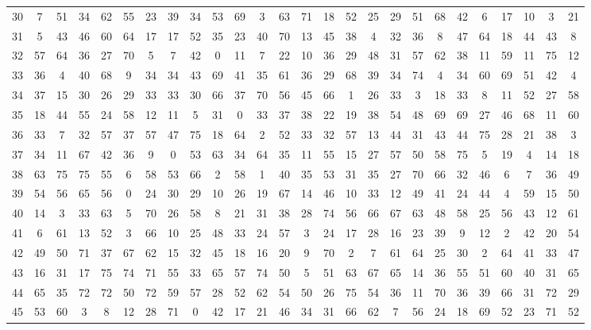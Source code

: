 \begin{table}
\begin{tabular}{c c c c c c c c c c c c c c c c c c c c c c c c c c }
30 & 7 & 51 & 34 & 62 & 55 & 23 & 39 & 34 & 53 & 69 & 3 & 63 & 71 & 18 & 52 & 25 & 29 & 51 & 68 & 42 & 6 & 17 & 10 & 3 & 21 \\
31 & 5 & 43 & 46 & 60 & 64 & 17 & 17 & 52 & 35 & 23 & 40 & 70 & 13 & 45 & 38 & 4 & 32 & 36 & 8 & 47 & 64 & 18 & 44 & 43 & 8 \\
32 & 57 & 64 & 36 & 27 & 70 & 5 & 7 & 42 & 0 & 11 & 7 & 22 & 10 & 36 & 29 & 48 & 31 & 57 & 62 & 38 & 11 & 59 & 11 & 75 & 12 \\
33 & 36 & 4 & 40 & 68 & 9 & 34 & 34 & 43 & 69 & 41 & 35 & 61 & 36 & 29 & 68 & 39 & 34 & 74 & 4 & 34 & 60 & 69 & 51 & 42 & 4 \\
34 & 37 & 15 & 30 & 26 & 29 & 33 & 33 & 30 & 66 & 37 & 70 & 56 & 45 & 66 & 1 & 26 & 33 & 3 & 18 & 33 & 8 & 11 & 52 & 27 & 58 \\
35 & 18 & 44 & 55 & 24 & 58 & 12 & 11 & 5 & 31 & 0 & 33 & 37 & 38 & 22 & 19 & 38 & 54 & 48 & 69 & 69 & 27 & 46 & 68 & 11 & 60 \\
36 & 33 & 7 & 32 & 57 & 37 & 57 & 47 & 75 & 18 & 64 & 2 & 52 & 33 & 32 & 57 & 13 & 44 & 31 & 43 & 44 & 75 & 28 & 21 & 38 & 3 \\
37 & 34 & 11 & 67 & 42 & 36 & 9 & 0 & 53 & 63 & 34 & 64 & 35 & 11 & 55 & 15 & 27 & 57 & 50 & 58 & 75 & 5 & 19 & 4 & 14 & 18 \\
38 & 63 & 75 & 75 & 55 & 6 & 58 & 53 & 66 & 2 & 58 & 1 & 40 & 35 & 53 & 31 & 35 & 27 & 70 & 66 & 32 & 46 & 6 & 7 & 36 & 49 \\
39 & 54 & 56 & 65 & 56 & 0 & 24 & 30 & 29 & 10 & 26 & 19 & 67 & 14 & 46 & 10 & 33 & 12 & 49 & 41 & 24 & 44 & 4 & 59 & 15 & 50 \\
40 & 14 & 3 & 33 & 63 & 5 & 70 & 26 & 58 & 8 & 21 & 31 & 38 & 28 & 74 & 56 & 66 & 67 & 63 & 48 & 58 & 25 & 56 & 43 & 12 & 61 \\
41 & 6 & 61 & 13 & 52 & 3 & 66 & 10 & 25 & 48 & 33 & 24 & 57 & 3 & 24 & 17 & 28 & 16 & 23 & 39 & 9 & 12 & 2 & 42 & 20 & 54 \\
42 & 49 & 50 & 71 & 37 & 67 & 62 & 15 & 32 & 45 & 18 & 16 & 20 & 9 & 70 & 2 & 7 & 61 & 64 & 25 & 30 & 2 & 64 & 41 & 33 & 47 \\
43 & 16 & 31 & 17 & 75 & 74 & 71 & 55 & 33 & 65 & 57 & 74 & 50 & 5 & 51 & 63 & 67 & 65 & 14 & 36 & 55 & 51 & 60 & 40 & 31 & 65 \\
44 & 65 & 35 & 72 & 72 & 50 & 72 & 59 & 57 & 28 & 52 & 62 & 54 & 50 & 26 & 75 & 54 & 36 & 11 & 70 & 36 & 39 & 66 & 31 & 72 & 29 \\
45 & 53 & 60 & 3 & 8 & 12 & 28 & 71 & 0 & 42 & 17 & 21 & 46 & 34 & 31 & 66 & 62 & 7 & 56 & 24 & 18 & 69 & 52 & 23 & 71 & 52 \\

\end{tabular}
\end{table}
